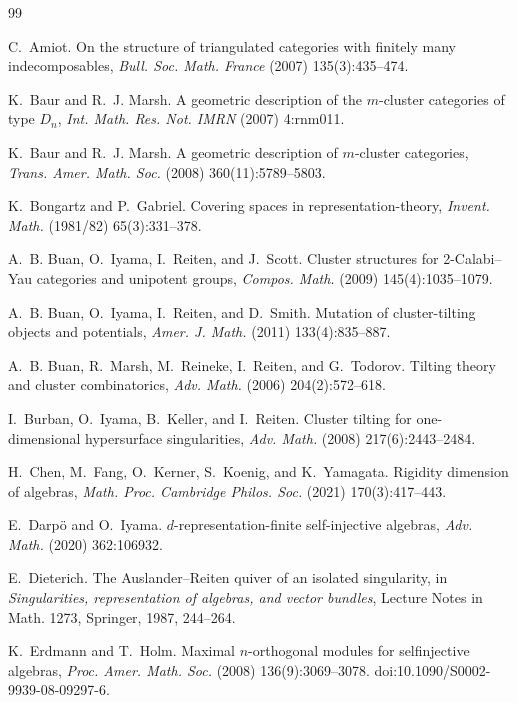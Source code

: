 \documentclass[12pt]{article}
\theoremstyle{plain}
\theoremstyle{definition}
\begin{document}
\begin{thebibliography}{99}

C.~Amiot.
\newblock On the structure of triangulated categories with finitely many
indecomposables, {\em Bull. Soc. Math. France} (2007) 135(3):435--474.

K.~Baur and R.~J. Marsh.
\newblock A geometric description of the \(m\)-cluster categories of type
\(D_n\), {\em Int. Math. Res. Not. IMRN} (2007) 4:rnm011.

K.~Baur and R.~J. Marsh.
\newblock A geometric description of \(m\)-cluster categories,
{\em Trans. Amer. Math. Soc.} (2008) 360(11):5789--5803.

K.~Bongartz and P.~Gabriel.
\newblock Covering spaces in representation-theory,
{\em Invent. Math.} (1981/82) 65(3):331--378.

A.~B. Buan, O.~Iyama, I.~Reiten, and J.~Scott.
\newblock Cluster structures for 2-Calabi--Yau categories and unipotent groups,
{\em Compos. Math.} (2009) 145(4):1035--1079.

A.~B. Buan, O.~Iyama, I.~Reiten, and D.~Smith.
\newblock Mutation of cluster-tilting objects and potentials,
{\em Amer. J. Math.} (2011) 133(4):835--887.

A.~B. Buan, R.~Marsh, M.~Reineke, I.~Reiten, and G.~Todorov.
\newblock Tilting theory and cluster combinatorics,
{\em Adv. Math.} (2006) 204(2):572--618.

I.~Burban, O.~Iyama, B.~Keller, and I.~Reiten.
\newblock Cluster tilting for one-dimensional hypersurface singularities,
{\em Adv. Math.} (2008) 217(6):2443--2484.

H.~Chen, M.~Fang, O.~Kerner, S.~Koenig, and K.~Yamagata.
\newblock Rigidity dimension of algebras,
{\em Math. Proc. Cambridge Philos. Soc.} (2021) 170(3):417--443.

E.~Darp\"o and O.~Iyama.
\newblock \(d\)-representation-finite self-injective algebras,
{\em Adv. Math.} (2020) 362:106932.

E.~Dieterich.
\newblock The Auslander--Reiten quiver of an isolated singularity,
in {\em Singularities, representation of algebras, and vector bundles},
Lecture Notes in Math. 1273, Springer, 1987, 244--264.

K.~Erdmann and T.~Holm.
\newblock Maximal \(n\)-orthogonal modules for selfinjective algebras,
{\em Proc. Amer. Math. Soc.} (2008) 136(9):3069--3078.
\newblock doi:10.1090/S0002-9939-08-09297-6.


\end{thebibliography}
\end{document}
